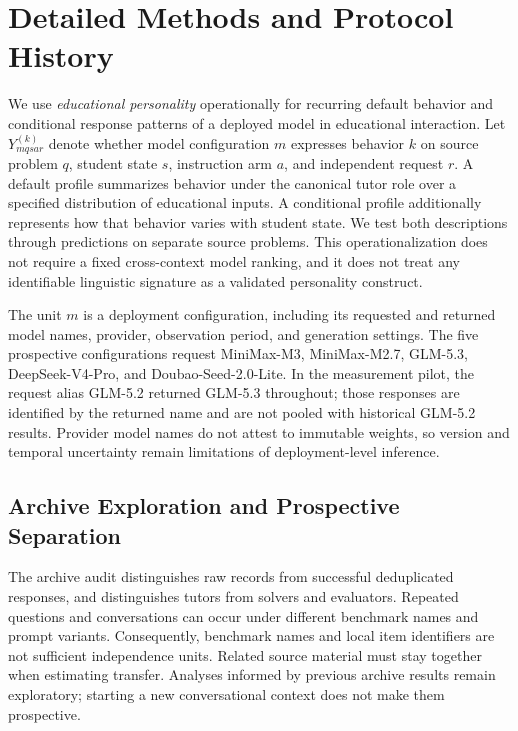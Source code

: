 \section{Detailed Methods and Protocol History}
\label{app:detailed-methods}

We use \emph{educational personality} operationally for recurring default
behavior and conditional response patterns of a deployed model in educational
interaction. Let $Y_{mqsar}^{(k)}$ denote whether model configuration $m$ expresses
behavior $k$ on source problem $q$, student state $s$, instruction arm $a$, and
independent request $r$. A default profile summarizes behavior under the
canonical tutor role over a specified distribution of educational inputs. A
conditional profile additionally represents how that behavior varies with
student state. We test both descriptions through predictions on separate source
problems. This operationalization does not require a fixed cross-context model
ranking, and it does not treat any identifiable linguistic signature as a
validated personality construct.

The unit $m$ is a deployment configuration, including its requested and returned
model names, provider, observation period, and generation settings. The five
prospective configurations request MiniMax-M3, MiniMax-M2.7, GLM-5.3,
DeepSeek-V4-Pro, and Doubao-Seed-2.0-Lite. In the measurement pilot, the request
alias GLM-5.2 returned GLM-5.3 throughout; those responses are identified by the
returned name and are not pooled with historical GLM-5.2 results. Provider model
names do not attest to immutable weights, so version and temporal uncertainty
remain limitations of deployment-level inference.




\subsection{Archive Exploration and Prospective Separation}

The archive audit distinguishes raw records from successful deduplicated
responses, and distinguishes tutors from solvers and evaluators. Repeated
questions and conversations can occur under different benchmark names and
prompt variants. Consequently, benchmark names and local item identifiers are
not sufficient independence units. Related source material must stay together
when estimating transfer. Analyses informed by previous archive results remain
exploratory; starting a new conversational context does not make them
prospective.

